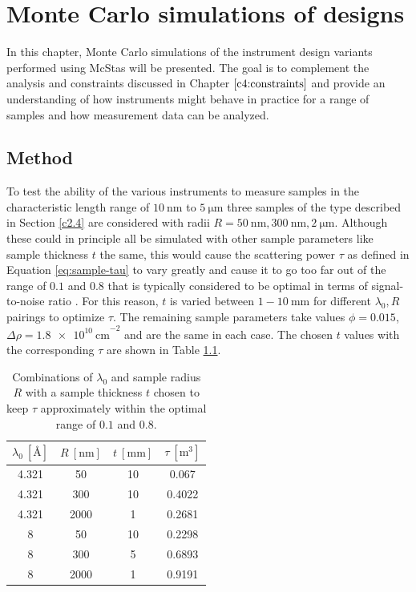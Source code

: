 \chapter{Monte Carlo simulations of designs}
\label{chapter:optimization}
\label{c6:monte-carlo}
In this chapter, Monte Carlo simulations of the instrument design variants performed using McStas \cite{willendrup2020} will be presented. The goal is to complement the analysis and constraints discussed in Chapter $\ref{c4:constraints}$ and provide an understanding of how instruments might behave in practice for a range of samples and how measurement data can be analyzed. 
\section{Method}
To test the ability of the various instruments to measure samples in the characteristic length range of $\SI{10}{\nano\meter}$ to $\SI{5}{\micro\meter}$ three samples of the type described in Section \ref{c2.4} are considered with radii $R = \SI{50}{\nano\meter}, \SI{300}{\nano\meter}, \SI{2}{\micro\meter}$. Although these could in principle all be simulated with other sample parameters like sample thickness $t$ the same, this would cause the scattering power $\tau$ as defined in Equation \eqref{eq:sample-tau} to vary greatly and cause it to go too far out of the range of $0.1$ and $0.8$ that is typically considered to be optimal in terms of signal-to-noise ratio \cite{bouwman2021b}\cite{heijkamp2011}. For this reason, $t$ is varied between $1 - 10 ~\unit{\milli\meter}$ for different $\lambda_0, R$ pairings to optimize $\tau$. The remaining sample parameters take values $\phi = 0.015$, $\Delta\rho = \SI{1.8e10}{\centi\meter}^{-2}$ and are the same in each case. The chosen $t$ values with the corresponding $\tau$ are shown in Table \ref{tab:sample-thickness}.

\begin{table}[h!]
	\centering
	\begin{tabular}{cc|cc}
		\toprule
		$\lambda_0~[\unit{\angstrom}]$  & $R ~[\unit{\nano\meter}]$  & $t ~[\unit{\milli\meter}]$& $\tau~[\unit{\meter^3}]$ \\
		\midrule
		\num{4.321} & \num{50} & \num{10} & \num{0.067}\\
		\num{4.321} & \num{300} & \num{10} & \num{0.4022} \\
		\num{4.321} & \num{2000} & \num{1} & \num{0.2681} \\
		\num{8} & \num{50} & \num{10} & \num{0.2298} \\
		\num{8} & \num{300} & \num{5} & \num{0.6893} \\
		\num{8} & \num{2000} & \num{1} & \num{0.9191} \\
		\bottomrule
	\end{tabular}
	\caption{Combinations of $\lambda_0$ and sample radius $R$ with a sample thickness $t$ chosen to keep $\tau$ approximately within the optimal range of $0.1$ and $0.8$.}
	\label{tab:sample-thickness}
\end{table}

